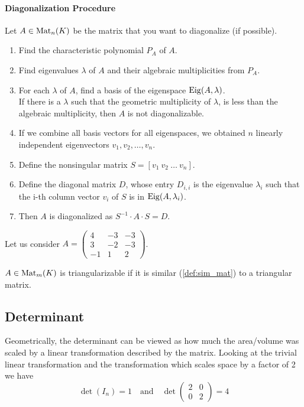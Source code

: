 \paragraph{Diagonalization Procedure}
Let \(A \in \operatorname{Mat}_n(K)\) be the matrix that you want to diagonalize (if possible).
\begin{enumerate}
   \item Find the characteristic polynomial \(P_A\) of \(A\).
   \item Find eigenvalues \(\lambda\) of \(A\) and their algebraic multiplicities from \(P_A\).
   \item For each \(\lambda\) of \(A\), find a basis of the eigenspace \(\operatorname{Eig}(A, \lambda)\).\\
      If there is a \(\lambda\) such that the geometric multiplicity of \(\lambda\), is less than the algebraic multiplicity, then \(A\) is not diagonalizable.
   \item If we combine all basis vectors for all eigenspaces, we obtained \(n\) linearly independent eigenvectors \(v_1, v_2, \ldots, v_n\).
   \item Define the nonsingular matrix \(S = [v_1~v_2~\ldots~v_n]\).
   \item Define the diagonal matrix \(D\), whose entry \(D_{i,i}\) is the eigenvalue \(\lambda_i\) such that the i-th column vector \(v_i\) of \(S\) is in \(\operatorname{Eig}(A, \lambda_i)\).
   \item Then \(A\) is diagonalized as \(S^{-1} \cdot A \cdot S = D\).
\end{enumerate}

\begin{example}
   Let us consider \(A = \begin{pmatrix}4 & -3 & -3\\3 & -2 & -3\\-1 & 1 & 2\end{pmatrix}\).
\end{example}

\begin{definition}
   \(A \in \operatorname{Mat}_m(K)\) is triangularizable if it is similar (\ref{def:sim_mat}) to a triangular matrix.
\end{definition}

\subsection{Determinant}
Geometrically, the determinant can be viewed as how much the area/volume was scaled by a linear transformation described by the matrix.
Looking at the trivial linear transformation and the transformation  which scales space by a factor of 2 we have
\[\det(I_n) = 1 \quad\text{and}\quad \det\begin{pmatrix}2&0\\0&2\end{pmatrix} = 4\]

